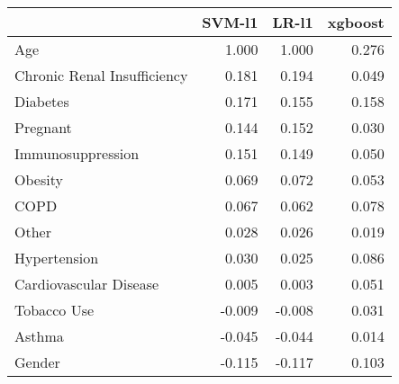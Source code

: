 \begin{tabular}{lrrr}
\toprule
{} &  SVM-l1 &  LR-l1 &  xgboost \\
\midrule
Age                         &   1.000 &  1.000 &    0.276 \\
Chronic Renal Insufficiency &   0.181 &  0.194 &    0.049 \\
Diabetes                    &   0.171 &  0.155 &    0.158 \\
Pregnant                    &   0.144 &  0.152 &    0.030 \\
Immunosuppression           &   0.151 &  0.149 &    0.050 \\
Obesity                     &   0.069 &  0.072 &    0.053 \\
COPD                        &   0.067 &  0.062 &    0.078 \\
Other                       &   0.028 &  0.026 &    0.019 \\
Hypertension                &   0.030 &  0.025 &    0.086 \\
Cardiovascular Disease      &   0.005 &  0.003 &    0.051 \\
Tobacco Use                 &  -0.009 & -0.008 &    0.031 \\
Asthma                      &  -0.045 & -0.044 &    0.014 \\
Gender                      &  -0.115 & -0.117 &    0.103 \\
\bottomrule
\end{tabular}
